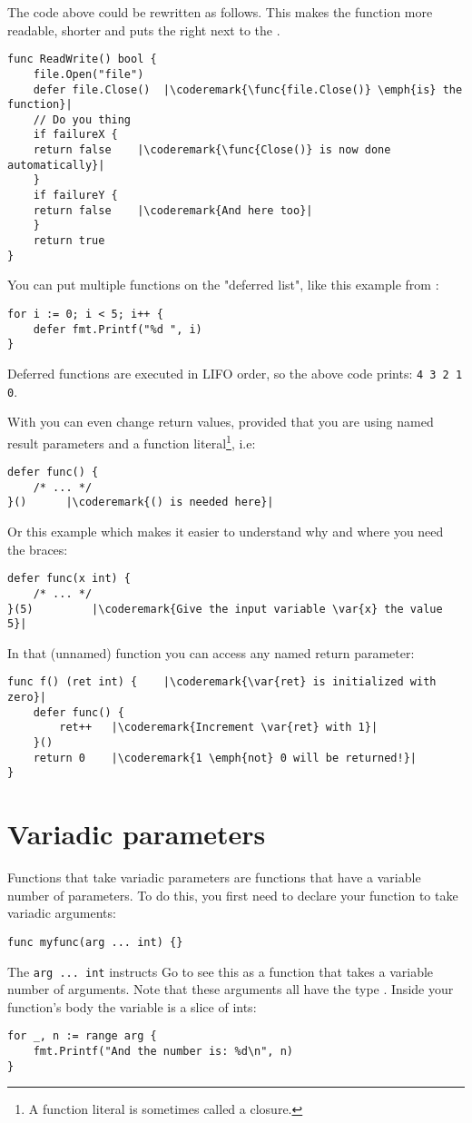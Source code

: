 The code above could be rewritten as follows. This makes the 
function more readable, shorter and puts the  right next 
to the .
\begin{lstlisting}[caption=With defer]
func ReadWrite() bool {
    file.Open("file")
    defer file.Close()	|\coderemark{\func{file.Close()} \emph{is} the function}|
    // Do you thing
    if failureX {
	return false    |\coderemark{\func{Close()} is now done automatically}|
    }
    if failureY {
	return false    |\coderemark{And here too}|
    }
    return true
}
\end{lstlisting}
You can put multiple functions on the "deferred list", like this
example from \cite{effective_go}:
\begin{lstlisting}
for i := 0; i < 5; i++ { 
    defer fmt.Printf("%d ", i) 
} 
\end{lstlisting}
Deferred functions are executed in LIFO order, so the above code
prints: \lstinline{4 3 2 1 0}. 

With  you can even change return values, provided that
you are using named result parameters and a function
literal\footnote{A function literal
is sometimes called a  closure.}, i.e:
\begin{lstlisting}[caption=Function literal]
defer func() {
	/* ... */
}()		 |\coderemark{() is needed here}|
\end{lstlisting}
Or this example which makes it easier to understand why and where
you need the braces:
\begin{lstlisting}[caption=Function literal with parameters]
defer func(x int) {
	/* ... */
}(5)		 |\coderemark{Give the input variable \var{x} the value 5}|
\end{lstlisting}
In that (unnamed) function you can access any named return
parameter:
\begin{lstlisting}[caption=Access return values within defer]
func f() (ret int) {    |\coderemark{\var{ret} is initialized with zero}|
	defer func() {
		ret++	|\coderemark{Increment \var{ret} with 1}|
	}()
	return 0	|\coderemark{1 \emph{not} 0 will be returned!}|
}
\end{lstlisting}

\section{Variadic parameters}
Functions that take variadic parameters are functions that have a
variable number of parameters. To do this, you first
need to declare your function to take variadic arguments:
\begin{lstlisting}
func myfunc(arg ... int) {}
\end{lstlisting}
The \lstinline{arg ... int} instructs Go to see this as a function that
takes a variable number of arguments. Note that these arguments all
have the type . Inside your function's body the variable
 is a slice of ints:
\begin{lstlisting}
for _, n := range arg {
    fmt.Printf("And the number is: %d\n", n)
}
\end{lstlisting}


